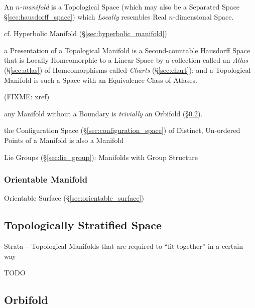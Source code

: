 An \emph{$n$-manifold} is a Topological Space (which may also be a Separated
Space \S\ref{sec:hausdorff_space}) which \emph{Locally} resembles Real
$n$-dimensional Space.

cf. Hyperbolic Manifold (\S\ref{sec:hyperbolic_manifold})


a Presentation of a Topological Manifold is a Second-countable Hausdorff Space
that is Locally Homeomorphic to a Linear Space by a collection called an
\emph{Atlas} (\S\ref{sec:atlas}) of Homeomorphisms called \emph{Charts}
(\S\ref{sec:chart}); and a Topological Manifold is such a Space with an
Equivalence Class of Atlases.

(FIXME: xref)

\fist any Manifold without a Boundary is \emph{trivially} an Orbifold
(\S\ref{sec:orbifold}).

the Configuration Space (\S\ref{sec:configuration_space}) of Distinct,
Un-ordered Points of a Manifold is also a Manifold

\fist Lie Groups (\S\ref{sec:lie_group}): Manifolds with Group Structure



\subsubsection{Orientable Manifold}\label{sec:orientable_manifold}

\fist Orientable Surface (\S\ref{sec:orientable_surface})



\subsection{Topologically Stratified Space}\label{sec:topologically_stratified}

Strata -- Topological Manifolds that are required to ``fit together'' in a
certain way

TODO



\subsection{Orbifold}\label{sec:orbifold}

